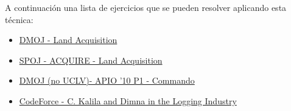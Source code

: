 A continuación una lista de ejercicios que se pueden resolver aplicando esta técnica:
\begin{itemize}
	\item \href{https://dmoj.uclv.edu.cu/problem/acquire}{DMOJ - Land Acquisition}
	\item \href{ http://www.spoj.com/problems/APIO10A/} {SPOJ - ACQUIRE - Land Acquisition}
	\item \href{https://dmoj.ca/problem/apio10p1}{DMOJ (no UCLV)- APIO '10 P1 - Commando}
	\item \href{https://codeforces.com/problemset/problem/319/C}{CodeForce - C. Kalila and Dimna in the Logging Industry}
\end{itemize}